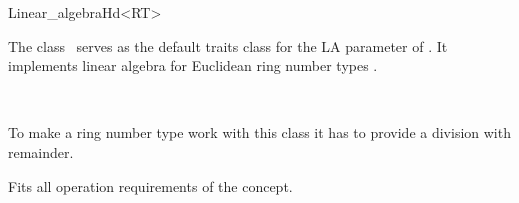 \ccAutoIndexingOff
\begin{ccRefClass}{Linear_algebraHd<RT>}
\ccAutoIndexingOn
{}

\ccDefinition

The class \ccRefName\ serves as the default traits class for the LA
parameter of .  It implements linear
algebra for Euclidean ring number types .


\ccIsModel

%
 \\


To make a ring number type  work with this class it has to
provide a division  with remainder.

\ccOperations

Fits all operation requirements of the concept.

\ccIndexTraitsClassEnd
\ccAutoIndexingOff
\end{ccRefClass}
\ccAutoIndexingOn     